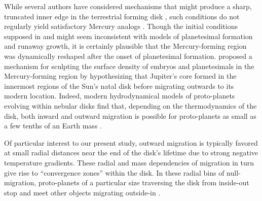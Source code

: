 \documentclass[trackchanges,twocolumn]{aastex}
\begin{document}
While several authors have considered mechanisms that might produce a sharp, truncated inner edge in the terrestrial forming disk \citep[e.g.: a condensation-front or highly localized planetesimal formation:][]{draz16,morby16_ice}, such conditions do not regularly yield satisfactory Mercury analogs \citep{hansen09,ray18_rev}.  Though the initial conditions supposed in \citet{clement21_merc3} and \citet{clement21_merc2} might seem inconsistent with models of planetesimal formation and runaway growth, it is certainly plausible that the Mercury-forming region was dynamically reshaped after the onset of planetesimal formation.  \citet{ray16} proposed a mechanism for sculpting the surface density of embryos and planetesimals in the Mercury-forming region by hypothesizing that Jupiter's core formed in the innermost regions of the Sun's natal disk before migrating outwards to its modern location.  Indeed, modern hydrodynamical models of proto-planets evolving within nebular disks find that, depending on the thermodynamics of the disk, both inward and outward migration is possible \citep{kley08,bitch15} for proto-planets as small as a few tenths of an Earth mass \citep{bitch15}.  

Of particular interest to our present study, outward migration is typically favored at small radial distances near the end of the disk's lifetime due to strong negative temperature gradients.  These radial and mass dependencies of migration in turn give rise to ``convergence zones'' within the disk.  In these radial bins of null-migration, proto-planets of a particular size traversing the disk from inside-out stop and meet other objects migrating outside-in \citep[see][for an application of this concept to the solar system's terrestrial planets]{broz21}.
\end{document}
